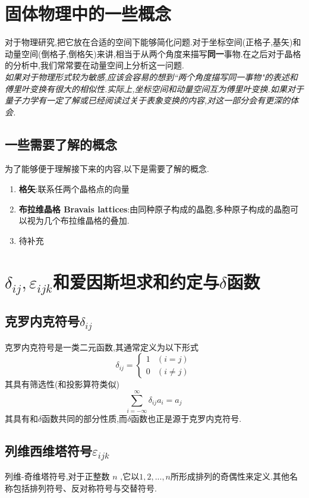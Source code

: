 \chapter{固体物理中的一些概念}
对于物理研究,把它放在合适的空间下能够简化问题.对于坐标空间(正格子,基矢)和动量空间(倒格子,倒格矢)来讲,相当于从两个角度来描写\textbf{同一}事物.在之后对于晶格的分析中,我们常常要在动量空间上分析这一问题.\\
\textit{如果对于物理形式较为敏感,应该会容易的想到``两个角度描写同一事物"的表述和傅里叶变换有很大的相似性.实际上,坐标空间和动量空间互为傅里叶变换.如果对于量子力学有一定了解或已经阅读过关于表象变换的内容,对这一部分会有更深的体会.}
\section*{一些需要了解的概念}
为了能够便于理解接下来的内容,以下是需要了解的概念.
\begin{enumerate}
	\item \textbf{格矢}:联系任两个晶格点的向量
	\item \textbf{布拉维晶格 Bravais lattices}:由同种原子构成的晶胞,多种原子构成的晶胞可以视为几个布拉维晶格的叠加.
	\item 待补充
\end{enumerate}


\chapter{$\delta_{ij},\varepsilon_{ijk}$和爱因斯坦求和约定与$\delta$函数}
\section{克罗内克符号$\delta_{ij}$}
克罗内克符号是一类二元函数,其通常定义为以下形式
\begin{equation}
	\delta _{ij}=\left\{{\begin{matrix}1&(i=j)\\0&(i\neq j)\end{matrix}}\right.\,\!
\end{equation}
其具有筛选性(和投影算符类似)
\begin{equation}
	\sum _{i=-\infty }^{\infty }\delta _{ij}a_{i}=a_{j}\,\!
\end{equation}
其具有和$\delta$函数共同的部分性质,而$\delta$函数也正是源于克罗内克符号.
\section{列维西维塔符号$\varepsilon_{ijk}$}
列维-奇维塔符号,对于正整数 $n$ ,它以$1, 2, ..., n $所形成排列的奇偶性来定义.其他名称包括排列符号、反对称符号与交替符号.

